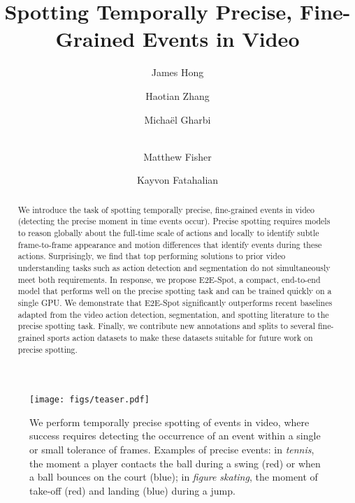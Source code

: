 \documentclass[runningheads]{llncs}
\begin{document}
\pagestyle{headings}
\mainmatter

\title{Spotting Temporally Precise, Fine-Grained Events in Video}

\author{
    James Hong \and
    Haotian Zhang \and
    Micha\"el Gharbi \and \\
    Matthew Fisher \and
    Kayvon Fatahalian
}

\maketitle

\begin{abstract}

We introduce the task of spotting temporally precise, fine-grained events in video (detecting the precise moment in time events occur).
Precise spotting requires models to reason globally about the full-time scale of actions and locally to identify subtle frame-to-frame appearance and motion differences that identify events during these actions.
Surprisingly, we find that top performing solutions to prior video understanding tasks such as action detection and segmentation do not simultaneously meet both requirements.
In response, we propose E2E-Spot, a compact, end-to-end model that performs well on the precise spotting task and can be trained quickly on a single GPU.
We demonstrate that E2E-Spot significantly outperforms recent baselines adapted from the video action detection, segmentation, and spotting literature to the precise spotting task.
Finally, we contribute new annotations and splits to several fine-grained sports action datasets to make these datasets suitable for future work on precise spotting.

\end{abstract}
 
\begin{figure}[t]
	\centering
	\texttt{[image: figs/teaser.pdf]}
	\caption{We perform temporally precise spotting of events in video, where success requires detecting the occurrence of an event within a single or small tolerance of frames.
Examples of precise events: in \textit{tennis}, the moment a player contacts the ball during a swing (red) or when a ball bounces on the court (blue); in \textit{figure skating}, the moment of take-off (red) and landing (blue) during a jump.
	}
	\label{fig:teaser}
\end{figure} 
\end{document}
